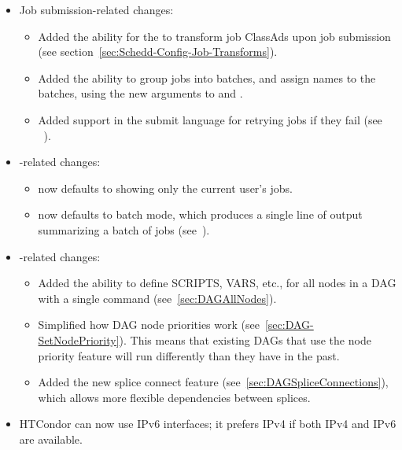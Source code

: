\begin{itemize}

\item Job submission-related changes:
  \begin{itemize}

   \item Added the ability for the  to transform
   job ClassAds upon job submission
   (see section~\ref{sec:Schedd-Config-Job-Transforms}).

   \item Added the ability to group jobs into batches, and assign
   names to the batches, using the new  arguments to
    and .

   \item Added support in the submit language for retrying jobs
   if they fail (see ~\pageref{condor-submit-max-retries}).

  \end{itemize}

\item {}-related changes:
  \begin{itemize}

  \item {} now defaults to showing only the current user's jobs.

  \item {} now defaults to batch mode, which produces a single
  line of output summarizing a batch of jobs (see~\pageref{batches-of-jobs}).

  \end{itemize}

\item {}-related changes:
  \begin{itemize}

  \item Added the ability to define SCRIPTS, VARS, etc., for all nodes
  in a DAG with a single command (see~\ref{sec:DAGAllNodes}).

  \item Simplified how DAG node priorities work
  (see~\ref{sec:DAG-SetNodePriority}).
  This means that existing DAGs that use the node priority feature
  will run differently than they have in the past.

  \item Added the new splice connect feature
  (see~\ref{sec:DAGSpliceConnections}), which
  allows more flexible dependencies between splices.

  \end{itemize}

  \item HTCondor can now use IPv6 interfaces; it prefers IPv4 if both
  IPv4 and IPv6 are available.
\end{itemize}

